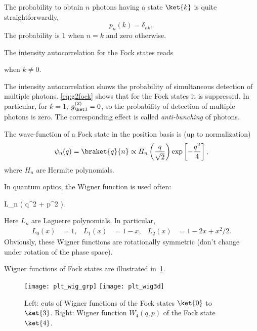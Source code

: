 \documentclass[fontsize=9pt,bookmarkpackage=false]{scrartcl}
\newcommand*{\mybx}[1]{\colorbox{mygr!15}{\hspace{1em}#1\hspace{1em}}}
\begin{document}
The probability to obtain $n$ photons having a state $\ket{k}$ is quite straightforwardly,
\begin{equation}
  p_n (k) = \delta_{nk },
\end{equation}
The probability is $1$ when $n = k$ and zero otherwise.

The intensity autocorrelation for the Fock states reads
when $k \neq 0$.

The intensity autocorrelation shows the probability of simultaneous detection of multiple photons.
\cref{eq:g2fock} shows that for the Fock states it is suppressed.
In particular, for $k = 1$, $g^{(2)}_{\ket 1} = 0$, so the probability of detection of multiple photons is zero.
The corresponding effect is called \emph{anti-bunching} of photons.

The wave-function of a Fock state in the position basis is (up to normalization)
\begin{equation}
  \psi_n (q) = \braket{ q }{ n }
  \propto H_n \left( \frac{ q }{ \sqrt{ 2 }} \right)
  \exp\left[ - \frac{ q ^2 }{ 4 } \right],
\end{equation}
where $H_n$ are Hermite polynomials.

In quantum optics, the Wigner function is used often:
\begin{empheq}[box=\mybx]{equation}
  W_n (q , p ) = \frac{ ( -1 )^{-1} }{ 2 \pi }
  \exp\left[ - \frac{ q^2 + p^2 }{ 2 } \right]
  L_n ( q^2 + p^2 ).
\end{empheq}
Here $L_n$ are Laguerre polynomials.
In particular,
\begin{align}
  L_0 (x) & = 1, &
  L_1 (x) & = 1 - x, &
  L_2 (x) & = 1 - 2 x + x^2 / 2.
\end{align}
Obviously, these Wigner functions are rotationally symmetric (don't change under rotation of the phase space).

Wigner functions of Fock states are illustrated in~\cref{fig:plt_wig_fock}.

\begin{figure}[htb]
  \centering
  \texttt{[image: plt\_wig\_grp]}
  \texttt{[image: plt\_wig3d]}
  \caption{
    Left: cuts of Wigner functions of the Fock states $\ket{0}$ to $\ket{3}$.
    Right: Wigner function $W_4(q,p)$ of the Fock state $\ket{4}$.
  }
  \label{fig:plt_wig_fock}
\end{figure}
\end{document}
